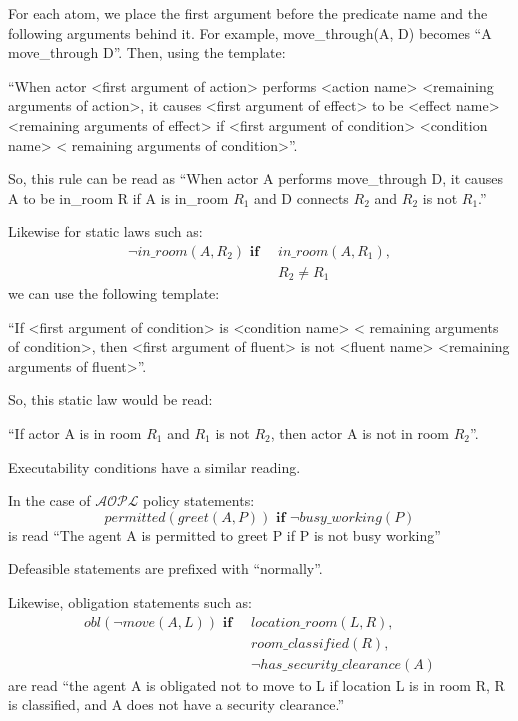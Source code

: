 For each atom, we place the first argument before the predicate name and the following arguments behind it.
For example, move\_through(A, D) becomes ``A move\_through D''.
Then, using the template:

``When actor <first argument of action> performs <action name> <remaining arguments of action>, it causes <first argument of effect> to be <effect name> <remaining arguments of effect> if <first argument of condition> <condition name> < remaining arguments of condition>''.

So, this rule can be read as ``When actor A performs move\_through D, it causes A to be in\_room R if A is in\_room $R_{1}$ and D connects $R_{2}$ and $R_{2}$ is not $R_{1}$.''

Likewise for static laws such as:
\begin{equation}
\begin{split}
    \neg in\_room(A, R_{2}) \textbf{ if } \
        & in\_room(A, R_{1}), \\
        & R_{2} \neq R_{1}
\end{split}
\end{equation}
we can use the following template:

``If <first argument of condition> is <condition name> < remaining arguments of condition>, then <first argument of fluent> is not <fluent name> <remaining arguments of fluent>''.

So, this static law would be read:

``If actor A is in room $R_{1}$ and $R_{1}$ is not $R_{2}$, then actor A is not in room $R_{2}$''.

Executability conditions have a similar reading.

In the case of $\mathcal{AOPL}$ policy statements:
\begin{equation}
    permitted(greet(A, P)) \textbf{ if }
        \neg busy\_working(P)
\end{equation}
is read ``The agent A is permitted to greet P if P is not busy working''

Defeasible statements are prefixed with ``normally''.

Likewise, obligation statements such as:
\begin{equation}
\begin{split}
    obl(\neg move(A, L)) \textbf{ if } \
        & location\_room(L, R), \\
        & room\_classified(R), \\
        & \neg has\_security\_clearance(A)
\end{split}
\end{equation}
are read ``the agent A is obligated not to move to L if location L is in room R, R is classified, and A does not have a security clearance.''


